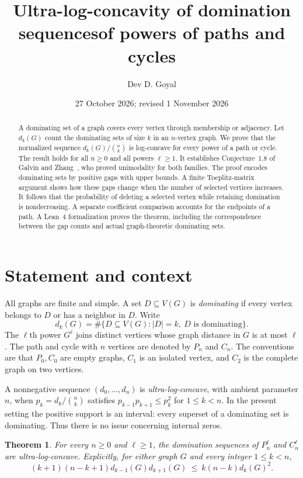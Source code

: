 \documentclass[11pt]{article}
\title{Ultra-log-concavity of domination sequences\newline of powers of paths and cycles}
\author{Dev D. Goyal}
\date{27 October 2026; revised 1 November 2026}
\newtheorem{theorem}{Theorem}[section]
\theoremstyle{definition}
\theoremstyle{remark}
\begin{document}
\maketitle

\begin{abstract}
A dominating set of a graph covers every vertex through membership or adjacency. Let $d_k(G)$ count the dominating sets of size $k$ in an $n$-vertex graph. We prove that the normalized sequence $d_k(G)/\binom nk$ is log-concave for every power of a path or cycle. The result holds for all $n\geq0$ and all powers $\ell\geq1$. It establishes Conjecture~1.8 of Galvin and Zhang~\cite{GZ}, who proved unimodality for both families. The proof encodes dominating sets by positive gaps with upper bounds. A finite Toeplitz-matrix argument shows how these gaps change when the number of selected vertices increases. It follows that the probability of deleting a selected vertex while retaining domination is nondecreasing. A separate coefficient comparison accounts for the endpoints of a path. A Lean~4 formalization proves the theorem, including the correspondence between the gap counts and actual graph-theoretic dominating sets.
\end{abstract}

\section{Statement and context}

All graphs are finite and simple. A set $D\subseteq V(G)$ is
\emph{dominating} if every vertex belongs to $D$ or has a neighbor in $D$.
Write
\[
 d_k(G)=\#\{D\subseteq V(G): |D|=k,\ D\text{ is dominating}\}.
\]
The $\ell$th power $G^\ell$ joins distinct vertices whose graph distance in
$G$ is at most $\ell$. The path and cycle with $n$ vertices are denoted by
$P_n$ and $C_n$. The conventions are that $P_0,C_0$ are empty graphs,
$C_1$ is an isolated vertex, and $C_2$ is the complete graph on two vertices.

A nonnegative sequence $(d_0,\ldots,d_n)$ is \emph{ultra-log-concave}, with
ambient parameter $n$, when $p_k=d_k/\binom nk$ satisfies
$p_{k-1}p_{k+1}\leq p_k^2$ for $1\leq k<n$. In the present setting the
positive support is an interval: every superset of a dominating set is
dominating. Thus there is no issue concerning internal zeros.

\begin{theorem}\label{thm:main}
For every $n\geq0$ and $\ell\geq1$, the domination sequences of
$P_n^\ell$ and $C_n^\ell$ are ultra-log-concave. Explicitly, for either
graph $G$ and every integer $1\leq k<n$,
\begin{equation}\label{eq:main}
 (k+1)(n-k+1)d_{k-1}(G)d_{k+1}(G)
 \ \leq\ k(n-k)d_k(G)^2.
\end{equation}
\end{theorem}
\end{document}
